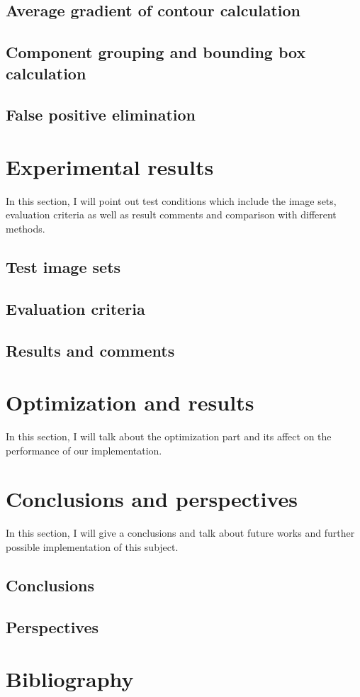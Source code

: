 \documentclass[12pt,a4paper]{article}
\begin{document}
\subsection{Average gradient of contour calculation}
\subsection{Component grouping and bounding box calculation}
\subsection{False positive elimination}
\section{Experimental results}
In this section, I will point out test conditions which include the image sets, evaluation criteria as well as result comments and comparison with different methods.
\subsection{Test image sets}
\subsection{Evaluation criteria}
\subsection{Results and comments}
\section{Optimization and results}
In this section, I will talk about the optimization part and its affect on the performance of our implementation.
\section{Conclusions and perspectives}
In this section, I will give a conclusions and talk about future works and further possible implementation of this subject.
\subsection{Conclusions}
\subsection{Perspectives}
\section{Bibliography}




	
\end{document}
